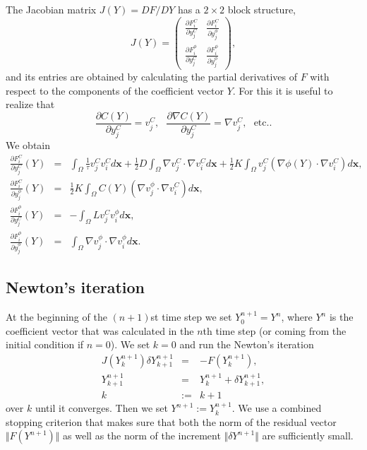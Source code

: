 \noindent
The Jacobian matrix $J(Y) = DF/DY$ has a $2\times 2$ block structure,
\begin{equation}
J(Y) = \left(
\begin{array}{cc}
  \displaystyle \frac{\partial F_i^C}{\partial y_j^C} & \displaystyle \frac{\partial F_i^C}{\partial y_j^{\phi}} \\ 
  \displaystyle \frac{\partial F_i^{\phi}}{\partial y_j^C} & \displaystyle \frac{\partial F_i^{\phi}}{\partial y_j^{\phi}}
\end{array}
\right),
\end{equation}
and its entries are obtained by calculating the partial derivatives of $F$ with
respect to the components of the coefficient vector $Y$. For this it is useful to 
realize that 
$$
\frac{\partial C(Y)}{\partial y_j^C} = v_j^C, \ \ \ 
\frac{\partial \nabla C(Y)}{\partial y_j^C} = \nabla v_j^C,\ \ \ \mbox{etc.}.
$$
We obtain
\begin{eqnarray}
  \frac{\partial F_i^C}{\partial y_j^C}(Y) &=& 
  \int_{\Omega} \frac{1}{\tau} v_j^C v_i^C d\mathbf{x} + 
  \frac 12 D\int_{\Omega} \nabla v_j^C \cdot \nabla v_i^C d\mathbf{x}
  + \frac 12 K\int_{\Omega} v_j^C \left(\nabla \phi(Y) \cdot \nabla v_i^C\right) d\mathbf{x},\label{eq:dFcdyc}\\
  \frac{\partial F_i^C}{\partial y_j^{\phi}}(Y) &=&
  \frac 12 K \int_{\Omega} C(Y) \left(\nabla v_j^{\phi} \cdot \nabla v_i^C\right) d\mathbf{x},\\
  \frac{\partial F_i^{\phi}}{\partial y_j^C}(Y) &=&
  - \int_{\Omega} L v_j^C v_i^{\phi} d\mathbf{x},\\
  \frac{\partial F_i^{\phi}}{\partial y_j^{\phi}}(Y) &=&
  \int_{\Omega} \nabla v_j^{\phi} \cdot \nabla v_i^{\phi} d\mathbf{x}\label{eq:dFphidyphi}.
\end{eqnarray}

\subsection{Newton's iteration}
At the beginning of the $(n+1)$st time step we 
set $Y^{n+1}_0 = Y^n$, where $Y^n$ is the coefficient vector  
that was calculated in the $n$th time step (or coming from the 
initial condition if $n = 0$). We set $k = 0$ and run the 
Newton's iteration 
\begin{eqnarray*}
J(Y^{n+1}_k) \delta Y^{n+1}_{k+1} &=& -F(Y^{n+1}_k), \\ 
Y^{n+1}_{k+1} &=& Y^{n+1}_k + \delta Y^{n+1}_{k+1}, \\
k &:=& k+1
\end{eqnarray*}
over $k$ until it converges. Then we set $Y^{n+1} := Y^{n+1}_{k}$. 
We use a combined stopping criterion 
that makes sure that both the norm of the residual vector $\Vert F(Y^{n+1})\Vert$ 
as well as the norm of the increment $\Vert \delta Y^{n+1}\Vert$ are sufficiently 
small.

